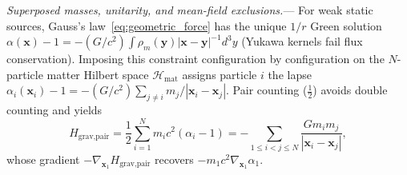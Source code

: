 \documentclass[aps,prl,reprint,superscriptaddress,nofootinbib,floatfix]{revtex4-2}
\theoremstyle{prlthm}
\newcommand{\prlsec}[1]{\par\smallskip\noindent\emph{#1.}---}
\begin{document}
\prlsec{Superposed masses, unitarity, and mean-field exclusions}
For weak static sources, Gauss's law~\eqref{eq:geometric_force} has the unique $1/r$ Green solution $\alpha(\mathbf{x})-1=-(G/c^2)\int\rho_m(\mathbf{y})|\mathbf{x}-\mathbf{y}|^{-1}d^3y$ (Yukawa kernels fail flux conservation). Imposing this constraint configuration by configuration on the $N$-particle matter Hilbert space $\mathcal{H}_\text{mat}$ assigns particle $i$ the lapse $\alpha_i(\mathbf{x}_i)-1=-(G/c^2)\sum_{j\neq i}m_j/|\mathbf{x}_i-\mathbf{x}_j|$. Pair counting ($\tfrac{1}{2}$) avoids double counting and yields
\begin{equation}
  H_\text{grav,pair}=\frac{1}{2}\sum_{i=1}^N m_i c^2(\alpha_i-1)=-\sum_{1\le i<j\le N}\frac{Gm_im_j}{|\mathbf{x}_i-\mathbf{x}_j|},
  \label{eq:h_grav_pair}
\end{equation}
whose gradient $-\nabla_{\mathbf{x}_1}H_\text{grav,pair}$ recovers $-m_1c^2\nabla_{\mathbf{x}_1}\alpha_1$.
\end{document}
